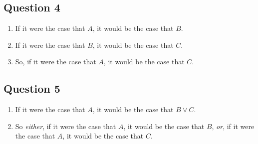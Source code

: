 \documentclass[
  11pt,
]{article}
\providecommand{\tightlist}{%
  \setlength{\itemsep}{0pt}\setlength{\parskip}{0pt}}
\begin{document}
\hypertarget{question-4}{%
\subsection{Question 4}\label{question-4}}

\begin{enumerate}
\def\labelenumi{\arabic{enumi}.}
\tightlist
\item
  If it were the case that \(A\), it would be the case that \(B\).
\item
  If it were the case that \(B\), it would be the case that \(C\).
\item
  So, if it were the case that \(A\), it would be the case that \(C\).
\end{enumerate}

\hypertarget{question-5}{%
\subsection{Question 5}\label{question-5}}

\begin{enumerate}
\def\labelenumi{\arabic{enumi}.}
\tightlist
\item
  If it were the case that \(A\), it would be the case that
  \(B \vee C\).
\item
  So \textit{either}, if it were the case that \(A\), it would be the
  case that \(B\), \textit{or}, if it were the case that \(A\), it would
  be the case that \(C\).
\end{enumerate}
\end{document}
